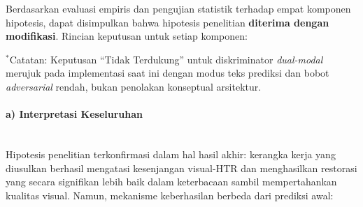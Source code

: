 \documentclass[12pt,a4paper]{article}
\begin{document}
Berdasarkan evaluasi empiris dan pengujian statistik terhadap empat komponen hipotesis, dapat disimpulkan bahwa hipotesis penelitian \textbf{diterima dengan modifikasi}. Rincian keputusan untuk setiap komponen:

\begin{table}[H]
\centering
\caption{Ringkasan Evaluasi Komponen Hipotesis Penelitian}
\label{tab:ringkasan-hipotesis}
\end{table}

\vspace{0.3em}
\small $^*$Catatan: Keputusan ``Tidak Terdukung'' untuk diskriminator \textit{dual-modal} merujuk pada implementasi saat ini dengan modus teks prediksi dan bobot \textit{adversarial} rendah, bukan penolakan konseptual arsitektur.
\normalsize

\paragraph{a) Interpretasi Keseluruhan}\mbox{}\\[0.1em]
Hipotesis penelitian terkonfirmasi dalam hal hasil akhir: kerangka kerja yang diusulkan berhasil mengatasi kesenjangan visual-HTR dan menghasilkan restorasi yang secara signifikan lebih baik dalam keterbacaan sambil mempertahankan kualitas visual. Namun, mekanisme keberhasilan berbeda dari prediksi awal:
\end{document}
